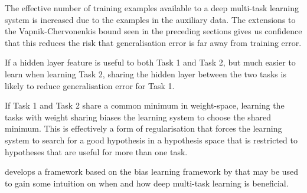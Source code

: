 \begin{description}
	\item [Statistical Data Amplification] The effective number of training examples available to a deep multi-task learning system is increased due to the examples in the auxiliary data. The extensions to the Vapnik-Chervonenkis bound seen in the preceding sections gives us confidence that this reduces the risk that generalisation error is far away from training error.
	\item [Eavesdropping] If a hidden layer feature is useful to both Task 1 and Task 2, but much easier to learn when learning Task 2, sharing the hidden layer between the two tasks is likely to reduce generalisation error for Task 1.
	\item [Representation Bias] If Task 1 and Task 2 share a common minimum in weight-space, learning the tasks with weight sharing biases the learning system to choose the shared minimum. This is effectively a form of regularisation that forces the learning system to search for a good hypothesis in a hypothesis space that is restricted to hypotheses that are useful for more than one task.
	\item \end{description}

\citet{galanti2016} develops a framework based on the bias learning framework by \citet{baxter2000} that may be used to gain some intuition on when and how deep multi-task learning is beneficial.